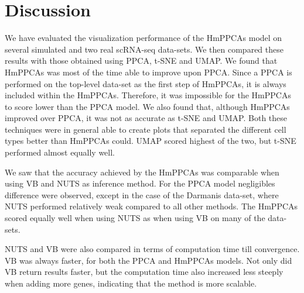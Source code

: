\chapter{Discussion}\label{sec:discussion}
We have evaluated the visualization performance of the HmPPCAs model on several simulated and two real scRNA-seq data-sets. We then compared these results with those obtained using PPCA, t-SNE and UMAP. We found that HmPPCAs was most of the time able to improve upon PPCA. Since a PPCA is performed on the top-level data-set as the first step of HmPPCAs, it is always included within the HmPPCAs. Therefore, it was impossible for the HmPPCAs to score lower than the PPCA model. We also found that, although HmPPCAs improved over PPCA, it was not as accurate as t-SNE and UMAP. Both these techniques were in general able to create plots that separated the different cell types better than HmPPCAs could. UMAP scored highest of the two, but t-SNE performed almost equally well.

We saw that the accuracy achieved by the HmPPCAs was comparable when using VB and NUTS as inference method. For the PPCA model negligibles difference were observed, except in the case of the Darmanis data-set, where NUTS performed relatively weak compared to all other methods. The HmPPCAs scored equally well when using NUTS as when using VB on many of the data-sets.


NUTS and VB were also compared in terms of computation time till convergence. VB was always faster, for both the PPCA and HmPPCAs models. Not only did VB return results faster, but the computation time also increased less steeply when adding more genes, indicating that the method is more scalable.

